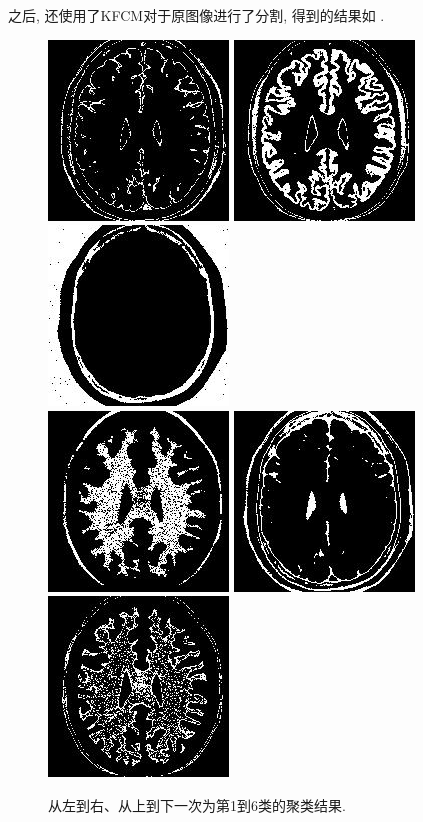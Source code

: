 \documentclass[lang=cn,11pt]{elegantpaper}
\begin{document}
之后, 还使用了KFCM对于原图像进行了分割, 得到的结果如 \cite{fig:KFCM}.
\begin{figure}
    \centering
    \includegraphics[width=.25\textwidth]{Brain/KFCM150/2020-03-19_21-10-05Kind3.jpg}
    \includegraphics[width=.25\textwidth]{Brain/KFCM150/2020-03-19_21-10-05Kind1.jpg}
    \includegraphics[width=.25\textwidth]{Brain/KFCM150/2020-03-19_21-10-05Kind5.jpg}\\

    \vspace{2pt}
    \includegraphics[width=.25\textwidth]{Brain/KFCM150/2020-03-19_21-10-05Kind4.jpg}
    \includegraphics[width=.25\textwidth]{Brain/KFCM150/2020-03-19_21-10-05Kind6.jpg}
    \includegraphics[width=.25\textwidth]{Brain/KFCM150/2020-03-19_21-10-05Kind2.jpg}
    \caption{从左到右、从上到下一次为第1到6类的聚类结果. \label{fig:KFCM}}
\end{figure}
\end{document}
